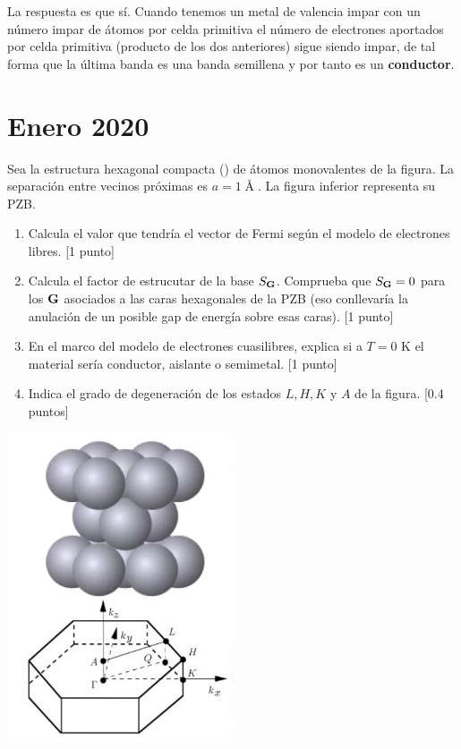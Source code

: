 \begin{solucion}
	La respuesta es que sí. Cuando tenemos un metal de valencia impar con un número impar de átomos por celda primitiva el número de electrones aportados por celda primitiva (producto de los dos anteriores) sigue siendo impar, de tal forma que la última banda es una banda semillena y por tanto es un \textbf{conductor}.
\end{solucion}


\newpage


\section{Enero 2020}
\setcounter{section}{3} %

\begin{ejercicio}
	Sea la estructura hexagonal compacta (\hcp) de átomos monovalentes de la figura. La separación entre vecinos próximas es $a=1\unit{\Angstrom}$. La figura inferior representa su PZB.
	\begin{enumerate}[label=\alph*)]
		\item Calcula el valor que tendría el vector de Fermi según el modelo de electrones libres. [1 punto]
		\item Calcula el factor de estrucutar de la base $S_{\mathbf{G}}$. Comprueba que $S_{\mathbf{G}}=0$ para los $\mathbf{G}$ asociados a las caras hexagonales de la PZB (eso conllevaría la anulación de un posible gap de energía sobre esas caras).  [1 punto]
		\item En el marco del modelo de electrones cuasilibres, explica si a $T=0$ K el material sería conductor, aislante o semimetal.  [1 punto]
		\item Indica el grado de degeneración de los estados $L,H,K$ y $A$ de la figura.  [0.4 puntos]
	\end{enumerate}
	\begin{center}
		\includegraphics[width=0.5\textwidth]{Imagenes/2020_Enero_01.png}
	\end{center}
\end{ejercicio}

